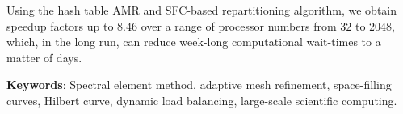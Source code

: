 
Using the hash table AMR and SFC-based repartitioning algorithm, we obtain speedup factors up to $8.46$ over a range of processor numbers from $32$ to $2048$, which, in the long run, can reduce week-long computational wait-times to a matter of days. 

\textbf{Keywords}: Spectral element method, adaptive mesh refinement, space-filling curves, Hilbert curve, dynamic load balancing, large-scale scientific computing.

 